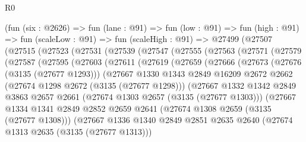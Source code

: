 \begin{lexlean}{R0}
\begin{coremodule}
    (fun (six : @2626) =>
    fun (lane : @91) =>
    fun (low : @91) =>
    fun (high : @91) =>
    fun (scaleLow : @91) =>
    fun (scaleHigh : @91) =>
    @27499
      (@27507
        (@27515
          (@27523
            (@27531
              (@27539
                (@27547
                  (@27555
                    (@27563
                      (@27571
                        (@27579
                          (@27587
                            (@27595
                              (@27603
                                (@27611
                                  (@27619
                                    (@27659
                                      (@27666
                                        (@27673
                                          (@27676 (@3135 (@27677 @1293)))
                                          (@27667
                                            @1330
                                            @1343
                                            @2849
                                            @16209
                                            @2672
                                            @2662
                                            (@27674 @1298 @2672 (@3135 (@27677 @1298)))
                                            (@27667
                                              @1332
                                              @1342
                                              @2849
                                              @3863
                                              @2657
                                              @2661
                                              (@27674 @1303 @2657 (@3135 (@27677 @1303)))
                                              (@27667
                                                @1334
                                                @1341
                                                @2849
                                                @2852
                                                @2659
                                                @2641
                                                (@27674 @1308 @2659 (@3135 (@27677 @1308)))
                                                (@27667
                                                  @1336
                                                  @1340
                                                  @2849
                                                  @2851
                                                  @2635
                                                  @2640
                                                  (@27674 @1313 @2635 (@3135 (@27677 @1313)))

\end{coremodule}
\end{lexlean}
